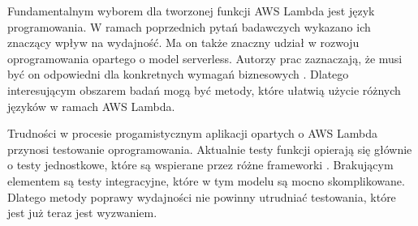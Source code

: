 Fundamentalnym wyborem dla tworzonej funkcji AWS Lambda jest język programowania.
W ramach poprzednich pytań badawczych wykazano ich znaczący wpływ na wydajność.
Ma on także znaczny udział w rozwoju oprogramowania opartego o model serverless.
Autorzy prac zaznaczają, że musi być on odpowiedni dla konkretnych wymagań biznesowych \cite{raza2021sok}\cite{8513710}.
Dlatego interesującym obszarem badań mogą być metody, które ułatwią użycie różnych języków w ramach AWS Lambda.

Trudności w procesie progamistycznym aplikacji opartych o AWS Lambda przynosi testowanie oprogramowania.
Aktualnie testy funkcji opierają się głównie o testy jednostkowe, które są wspierane przez różne frameworki \cite{8605774}.
Brakującym elementem są testy integracyjne, które w tym modelu są mocno skomplikowane.
Dlatego metody poprawy wydajności nie powinny utrudniać testowania, które jest już teraz jest wyzwaniem.
